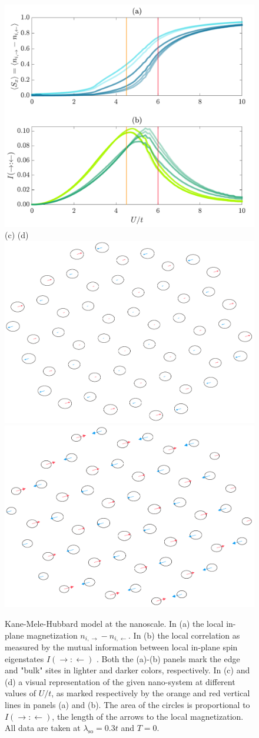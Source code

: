\documentclass[edipack_sp.tex]{subfiles}
\begin{document}
\begin{figure}
    \centering
    \includegraphics[width=0.8\linewidth]{figures/flakes_edipack.pdf}\\[1mm]
    (c) \hspace{10cm} (d) \\
    \hspace{1.2cm}
    \includegraphics[width=0.33\linewidth]{figures/3NflakeU4.5_x.pdf} \hspace{1.2cm}
    \includegraphics[width=0.33\linewidth]{figures/3NflakeU6_x.pdf} \vspace{3mm}
    \caption{Kane-Mele-Hubbard model at the nanoscale.
    In (a) the local in-plane
    magnetization $n_{i,\rightarrow}-n_{i,\leftarrow}$. In
    (b) the local correlation as measured by the mutual 
    information between local in-plane spin eigenstates
    $I(\rightarrow:\leftarrow)$ \cite{BellomiaPhD}. Both the
    (a)-(b) panels mark the edge and "bulk" sites in lighter 
    and darker colors, respectively.
    In (c) and (d) a visual representation of the given 
    nano-system at different values of $U/t$, as marked 
    respectively by the orange and red vertical lines 
    in panels (a) and (b). The area of the 
    circles is proportional to $I(\rightarrow:\leftarrow)$, 
    the length of the arrows to the local magnetization.
    All data are taken at $\lambda_\mathrm{so}=0.3t$ and $T=0$.}
    \label{fig:KMflake}
\end{figure}
\end{document}
